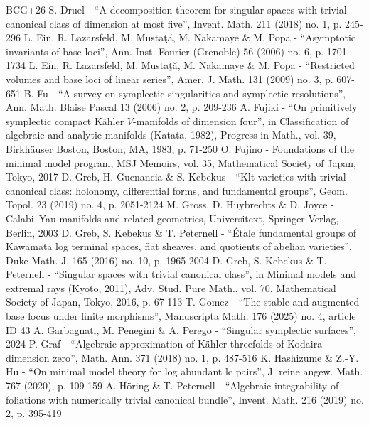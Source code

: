 \documentclass[10pt]{amsart}
\theoremstyle{plain}
\theoremstyle{definition}
\begin{document}
\begin{thebibliography}{BCG+26}
 S. Druel - “A decomposition theorem for singular spaces with trivial canonical class of dimension at most five”, Invent. Math. 211 (2018) no. 1, p. 245-296
 L. Ein, R. Lazarsfeld, M. Mustaţă, M. Nakamaye \& M. Popa - “Asymptotic invariants of base loci”, Ann. Inst. Fourier (Grenoble) 56 (2006) no. 6, p. 1701-1734
 L. Ein, R. Lazarsfeld, M. Mustaţă, M. Nakamaye \& M. Popa - “Restricted volumes and base loci of linear series”, Amer. J. Math. 131 (2009) no. 3, p. 607-651
 B. Fu - “A survey on symplectic singularities and symplectic resolutions”, Ann. Math. Blaise Pascal 13 (2006) no. 2, p. 209-236
 A. Fujiki - “On primitively symplectic compact Kähler $V$-manifolds of dimension four”, in Classification of algebraic and analytic manifolds (Katata, 1982), Progress in Math., vol. 39, Birkhäuser Boston, Boston, MA, 1983, p. 71-250
 O. Fujino - Foundations of the minimal model program, MSJ Memoirs, vol. 35, Mathematical Society of Japan, Tokyo, 2017
 D. Greb, H. Guenancia \& S. Kebekus - “Klt varieties with trivial canonical class: holonomy, differential forms, and fundamental groups”, Geom. Topol. 23 (2019) no. 4, p. 2051-2124
 M. Gross, D. Huybrechts \& D. Joyce - Calabi–Yau manifolds and related geometries, Universitext, Springer-Verlag, Berlin, 2003
 D. Greb, S. Kebekus \& T. Peternell - “Étale fundamental groups of Kawamata log terminal spaces, flat sheaves, and quotients of abelian varieties”, Duke Math. J. 165 (2016) no. 10, p. 1965-2004
 D. Greb, S. Kebekus \& T. Peternell - “Singular spaces with trivial canonical class”, in Minimal models and extremal rays (Kyoto, 2011), Adv. Stud. Pure Math., vol. 70, Mathematical Society of Japan, Tokyo, 2016, p. 67-113
 T. Gomez - “The stable and augmented base locus under finite morphisms”, Manuscripta Math. 176 (2025) no. 4, article ID 43
 A. Garbagnati, M. Penegini \& A. Perego - “Singular symplectic surfaces”, 2024
 P. Graf - “Algebraic approximation of Kähler threefolds of Kodaira dimension zero”, Math. Ann. 371 (2018) no. 1, p. 487-516
 K. Hashizume \& Z.-Y. Hu - “On minimal model theory for log abundant lc pairs”, J. reine angew. Math. 767 (2020), p. 109-159
 A. Höring \& T. Peternell - “Algebraic integrability of foliations with numerically trivial canonical bundle”, Invent. Math. 216 (2019) no. 2, p. 395-419

\end{thebibliography}
\end{document}
